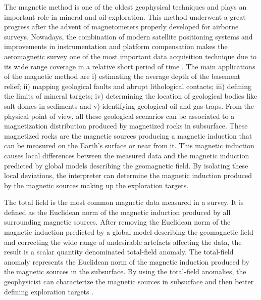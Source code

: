 \documentclass[journal abbreviation, npg]{copernicus}
\begin{document}
The magnetic method is one of the oldest geophysical techniques and plays an important role in mineral and oil exploration. This method underwent a great progress after the advent of magnetometers properly developed for airborne surveys. Nowadays, the combination of modern satellite positioning systems and improvements in instrumentation and platform compensation makes the aeromagnetic survey one of the most important data acquisition technique due to its wide range coverage in a relative short period of time \citep{blakely1996, nabighian-etal2005}. The main applications of the magnetic method are i) estimating the average depth of the basement relief; ii) mapping geological faults and abrupt lithological contacts; iii) defining the limits of mineral targets; iv) determining the location of geological bodies like salt domes in sediments and v) identifying geological oil and gas traps. From the physical point of view, all these geological scenarios can be associated to a magnetization distribution produced by magnetized rocks in subsurface. These magnetized rocks are the magnetic sources producing a magnetic induction that can be measured on the Earth’s surface or near from it. This magnetic induction causes local differences between the measured data and the magnetic induction predicted by global models describing the geomagnetic field. By isolating these local deviations, the interpreter can determine the magnetic induction produced by the magnetic sources making up the exploration targets.

The total field is the  most common magnetic data measured in a survey. It is defined as the Euclidean norm of the magnetic induction produced by all surrounding magnetic sources. After removing the Euclidean norm of the magnetic induction predicted by a global model describing the geomagnetic field and correcting the wide range of undesirable artefacts affecting the data, the result is a scalar quantity denominated total-field anomaly. The total-field anomaly represents the Euclidean norm of the magnetic induction produced by the magnetic sources in the subsurface. By using the total-field anomalies, the geophysicist can characterize the magnetic sources in subsurface and then better defining exploration targets \citep{telford-etal1990, blakely1996}.
\end{document}
